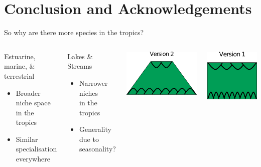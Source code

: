 \documentclass{beamer}
\begin{document}
\section*{Conclusion and Acknowledgements}
  \begin{frame}{So why are there more species in the tropics?}
    \begin{columns}
    \column{.5in}
    \column{2.5in}
      \begin{block}{Estuarine, marine, \& terrestrial}
        \begin{itemize}
          \item Broader niche space\\ in the tropics
          \item Similar specialisation\\ everywhere
        \end{itemize}
      \end{block}

    \vspace{.5cm}

    \begin{block}{Lakes \& Streams}
      \begin{itemize}
        \item Narrower niches\\ in the tropics
        \item Generality due to seasonality?
      \end{itemize}
    \end{block}

      \column{1.5in}
        \centering
        \includegraphics[height=.75in]{Figures/version2.eps}

    \vspace{1cm}

        \includegraphics[height=.75in]{Figures/version1.eps}
    \column{.5in}
    \end{columns}

  \end{frame}
\end{document}
